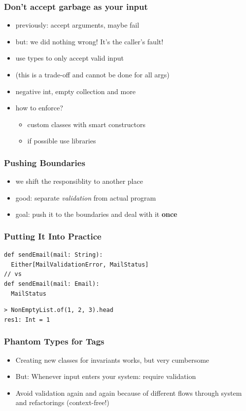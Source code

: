 \documentclass{beamer}
\begin{document}
\begin{frame}
  \frametitle{Don't accept garbage as your input}
   \begin{itemize}
  \item previously: accept arguments, maybe fail
  \item but: we did nothing wrong!  It's the caller's fault!
  \item use types to only accept valid input
  \item (this is a trade-off and cannot be done for all args)
  \item negative int, empty collection and more
  \item how to enforce?
    \begin{itemize}
    \item custom classes with smart constructors
    \item if possible use libraries
    \end{itemize}
  \end{itemize}
\end{frame}

\begin{frame}
  \frametitle{Pushing Boundaries}
  \begin{itemize}
  \item we shift the responsiblity to another place
  \item good: separate \textit{validation} from actual program
  \item goal: push it to the boundaries and deal with it \textbf{once}
  \end{itemize}
\end{frame}

\begin{frame}
  \frametitle{Putting It Into Practice}
\begin{verbatim}
def sendEmail(mail: String): 
  Either[MailValidationError, MailStatus]
// vs
def sendEmail(mail: Email): 
  MailStatus
\end{verbatim}
\begin{verbatim}
> NonEmptyList.of(1, 2, 3).head
res1: Int = 1
\end{verbatim}
\end{frame}

\begin{frame}
  \frametitle{Phantom Types for Tags}
  \begin{itemize}
  \item Creating new classes for invariants works, but very cumbersome
  \item But: Whenever input enters your system: require validation
  \item Avoid validation again and again because of different flows
    through system and refactorings (context-free!)
  \end{itemize}
\end{frame}
\end{document}
